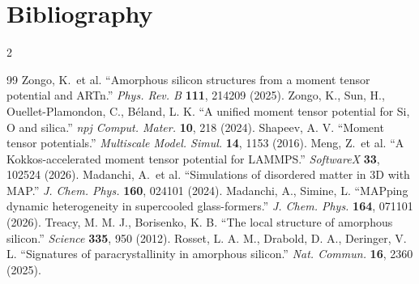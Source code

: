 \documentclass[11pt]{article}
\begin{document}
\appendix

\section{Bibliography}
\scriptsize
\begin{multicols}{2}
\begin{thebibliography}{99}
 Zongo, K.\ et al. ``Amorphous silicon structures from a moment tensor potential and ARTn.'' \textit{Phys. Rev. B} \textbf{111}, 214209 (2025).
 Zongo, K., Sun, H., Ouellet-Plamondon, C., B\'eland, L. K. ``A unified moment tensor potential for Si, O and silica.'' \textit{npj Comput. Mater.} \textbf{10}, 218 (2024).
 Shapeev, A. V. ``Moment tensor potentials.'' \textit{Multiscale Model. Simul.} \textbf{14}, 1153 (2016).
 Meng, Z.\ et al. ``A Kokkos-accelerated moment tensor potential for LAMMPS.'' \textit{SoftwareX} \textbf{33}, 102524 (2026).
 Madanchi, A.\ et al. ``Simulations of disordered matter in 3D with MAP.'' \textit{J. Chem. Phys.} \textbf{160}, 024101 (2024).
 Madanchi, A., Simine, L. ``MAPping dynamic heterogeneity in supercooled glass-formers.'' \textit{J. Chem. Phys.} \textbf{164}, 071101 (2026).
 Treacy, M. M. J., Borisenko, K. B. ``The local structure of amorphous silicon.'' \textit{Science} \textbf{335}, 950 (2012).
 Rosset, L. A. M., Drabold, D. A., Deringer, V. L. ``Signatures of paracrystallinity in amorphous silicon.'' \textit{Nat. Commun.} \textbf{16}, 2360 (2025).
\end{thebibliography}
\end{multicols}
\normalsize
\end{document}
